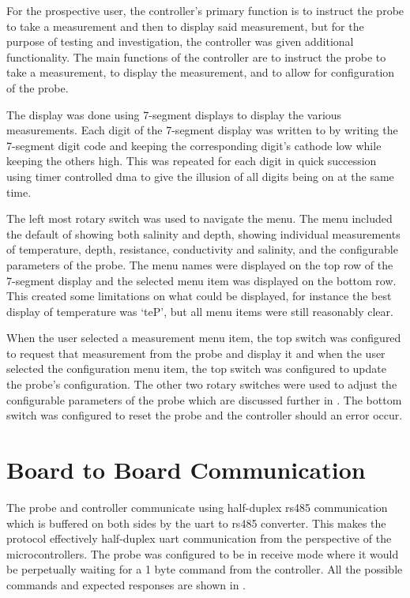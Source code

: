 For the prospective user, the controller's primary function is to instruct the probe to take a measurement and then to display said measurement, but for the purpose of testing and investigation, the controller was given additional functionality.
The main functions of the controller are to instruct the probe to take a measurement, to display the measurement, and to allow for configuration of the probe.

The display was done using 7-segment displays to display the various measurements.
Each digit of the 7-segment display was written to by writing the 7-segment digit code and keeping the corresponding digit's cathode low while keeping the others high.
This was repeated for each digit in quick succession using timer controlled \gls{dma} to give the illusion of all digits being on at the same time.

The left most rotary switch was used to navigate the menu.
The menu included the default of showing both salinity and depth, showing individual measurements of temperature, depth, resistance, conductivity and salinity, and the configurable parameters of the probe.
The menu names were displayed on the top row of the 7-segment display and the selected menu item was displayed on the bottom row.
This created some limitations on what could be displayed, for instance the best display of temperature was `teP', but all menu items were still reasonably clear.

When the user selected a measurement menu item, the top switch was configured to request that measurement from the probe and display it and when the user selected the configuration menu item, the top switch was configured to update the probe's configuration.
The other two rotary switches were used to adjust the configurable parameters of the probe which are discussed further in .
The bottom switch was configured to reset the probe and the controller should an error occur.

\section{Board to Board Communication}\label{sec:board-to-board-communication}

The probe and controller communicate using half-duplex \gls{rs485} communication which is buffered on both sides by the \gls{uart} to \gls{rs485} converter.
This makes the protocol effectively half-duplex \gls{uart} communication from the perspective of the microcontrollers.
The probe was configured to be in receive mode where it would be perpetually waiting for a 1 byte command from the controller.
All the possible commands and expected responses are shown in .

